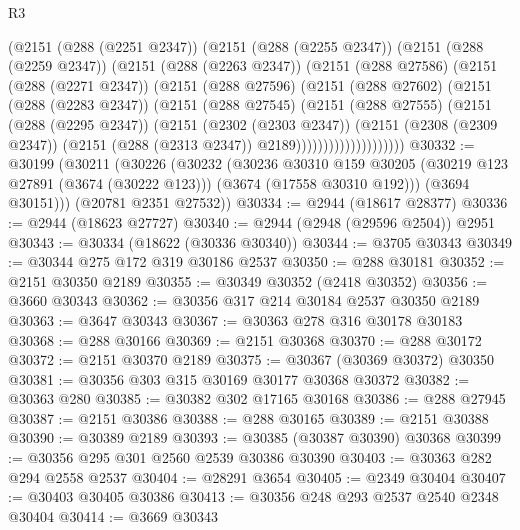 \begin{lexlean}{R3}
\begin{coremodule}
              (@2151
                (@288 (@2251 @2347))
                (@2151
                  (@288 (@2255 @2347))
                  (@2151
                    (@288 (@2259 @2347))
                    (@2151
                      (@288 (@2263 @2347))
                      (@2151
                        (@288 @27586)
                        (@2151
                          (@288 (@2271 @2347))
                          (@2151
                            (@288 @27596)
                            (@2151
                              (@288 @27602)
                              (@2151
                                (@288 (@2283 @2347))
                                (@2151
                                  (@288 @27545)
                                  (@2151
                                    (@288 @27555)
                                    (@2151
                                      (@288 (@2295 @2347))
                                      (@2151
                                        (@2302 (@2303 @2347))
                                        (@2151
                                          (@2308 (@2309 @2347))
                                          (@2151 (@288 (@2313 @2347)) @2189))))))))))))))))))))
@30332 := @30199
    (@30211
      (@30226
        (@30232
          (@30236
            @30310
            @159
            @30205
            (@30219 @123 @27891 (@3674 (@30222 @123)))
            (@3674 (@17558 @30310 @192)))
          (@3694 @30151)))
      (@20781 @2351 @27532))
@30334 := @2944 (@18617 @28377)
@30336 := @2944 (@18623 @27727)
@30340 := @2944 (@2948 (@29596 @2504)) @2951
@30343 := @30334 (@18622 (@30336 @30340))
@30344 := @3705 @30343
@30349 := @30344 @275 @172 @319 @30186 @2537
@30350 := @288 @30181
@30352 := @2151 @30350 @2189
@30355 := @30349 @30352 (@2418 @30352)
@30356 := @3660 @30343
@30362 := @30356 @317 @214 @30184 @2537 @30350 @2189
@30363 := @3647 @30343
@30367 := @30363 @278 @316 @30178 @30183
@30368 := @288 @30166
@30369 := @2151 @30368
@30370 := @288 @30172
@30372 := @2151 @30370 @2189
@30375 := @30367 (@30369 @30372) @30350
@30381 := @30356 @303 @315 @30169 @30177 @30368 @30372
@30382 := @30363 @280
@30385 := @30382 @302 @17165 @30168
@30386 := @288 @27945
@30387 := @2151 @30386
@30388 := @288 @30165
@30389 := @2151 @30388
@30390 := @30389 @2189
@30393 := @30385 (@30387 @30390) @30368
@30399 := @30356 @295 @301 @2560 @2539 @30386 @30390
@30403 := @30363 @282 @294 @2558 @2537
@30404 := @28291 @3654
@30405 := @2349 @30404
@30407 := @30403 @30405 @30386
@30413 := @30356 @248 @293 @2537 @2540 @2348 @30404
@30414 := @3669 @30343

\end{coremodule}
\end{lexlean}
